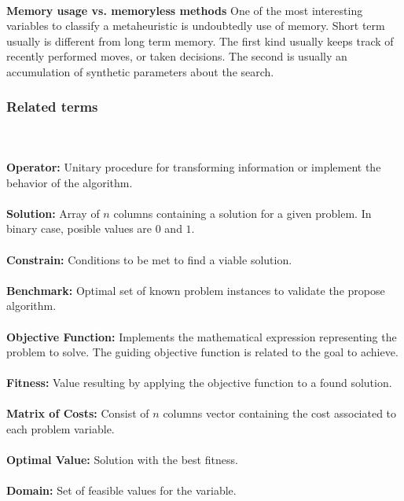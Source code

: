 ~\\
\textbf{Memory usage vs. memoryless methods}
One of the most interesting variables to classify a metaheuristic is undoubtedly use of memory. Short term usually is different from long term memory. The first kind usually keeps track of recently performed moves, or taken decisions. The second is usually an accumulation of synthetic parameters about the search. 

\subsubsection{Related terms}
~\\~\\
\textbf{Operator:} 
Unitary procedure for transforming information or implement the behavior of the algorithm.\\~\\

\textbf{Solution:} 
Array of $n$ columns containing a solution for a given problem. In binary case, posible values are $0$ and $1$.\\~\\

\textbf{Constrain:} 
Conditions to be met to find a viable solution.\\~\\

\textbf{Benchmark:} 
Optimal set of known problem instances to validate the propose algorithm.\\~\\

\textbf{Objective Function:}  
Implements the mathematical expression representing the problem to solve. The guiding objective function is related to the goal to achieve.\\~\\

\textbf{Fitness:} 
Value resulting by applying the objective function to a found solution.\\~\\

\textbf{Matrix of Costs:} 
Consist of $n$ columns vector containing the cost associated to each problem variable.\\~\\

\textbf{Optimal Value:} 
Solution with the best fitness.\\~\\

\textbf{Domain:} 
Set of feasible values for the variable.\\~\\

